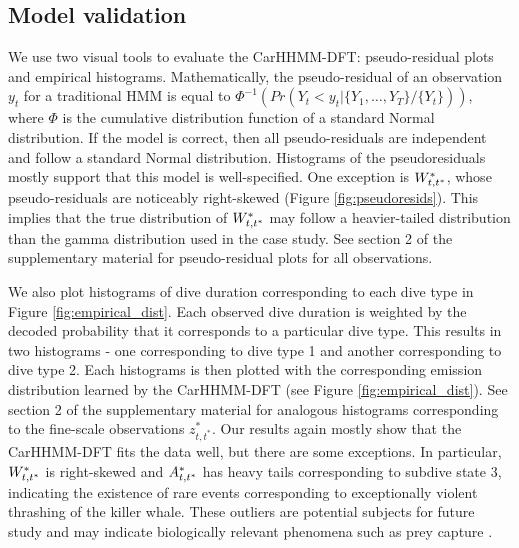 \subsection{Model validation}
\label{subsec:model_validation}

We use two visual tools to evaluate the CarHHMM-DFT: pseudo-residual plots and empirical histograms. 
Mathematically, the pseudo-residual of an observation $y_t$ for a traditional HMM is equal to $\Phi^{-1} \left(Pr(Y_t < y_t|\{Y_1,\ldots,Y_T\}/\{Y_t\}) \right)$, where $\Phi$ is the cumulative distribution function of a standard Normal distribution. If the model is correct, then all pseudo-residuals are independent and follow a standard Normal distribution. Histograms of the pseudoresiduals mostly support that this model is well-specified. One exception is $W^*_{t,t^*}$, whose pseudo-residuals are noticeably right-skewed (Figure \ref{fig:pseudoresids}). This implies that the true distribution of $W^*_{t,t^*}$ may follow a heavier-tailed distribution than the gamma distribution used in the case study. See section 2 of the supplementary material for pseudo-residual plots for all observations.

We also plot histograms of dive duration corresponding to each dive type in Figure \ref{fig:empirical_dist}. Each observed dive duration is weighted by the decoded probability that it corresponds to a particular dive type. This results in two histograms - one corresponding to dive type 1 and another corresponding to dive type 2. Each histograms is then plotted with the corresponding emission distribution learned by the CarHHMM-DFT (see Figure \ref{fig:empirical_dist}). See section 2 of the supplementary material for analogous histograms corresponding to the fine-scale observations $z^*_{t,t^*}$. Our results again mostly show that the CarHHMM-DFT fits the data well, but there are some exceptions. In particular, $W^*_{t,t^*}$ is right-skewed and $A^*_{t,t^*}$ has heavy tails corresponding to subdive state 3, indicating the existence of rare events corresponding to exceptionally violent thrashing of the killer whale. These outliers are potential subjects for future study and may indicate biologically relevant phenomena such as prey capture \citep{Tennessen:2019a}.

